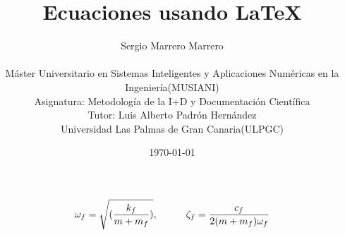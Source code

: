 \documentclass[12pt,a4paper]{article}
\begin{document}
\title{Ecuaciones usando \LaTeX}
\author{
Sergio Marrero Marrero\\ \\
\small{Máster Universitario en Sistemas Inteligentes y Aplicaciones Numéricas en la Ingeniería(MUSIANI)}\\
\small{Asignatura: Metodología de la I+D y Documentación Científica}\\
\small{Tutor: Luis Alberto Padrón Hernández }\\
\small{Universidad Las Palmas de Gran Canaria(ULPGC)}\\
}
\date{\small{\today}}

\maketitle


\vspace{20mm}



\begin{equation}
\omega_{f}=\sqrt{(\frac{k_{f}}{m+m_f})}, \hspace{10mm} \zeta_f=\frac{c_f}{2(m+m_f)\omega_f}
\end{equation}




\vspace{10mm}
\end{document}
